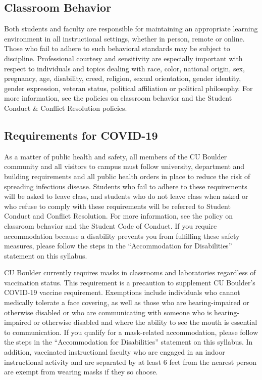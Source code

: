 \documentclass[9pt]{article}
\begin{document}
{\small

    \subsection*{Classroom Behavior}
Both students and faculty are responsible for maintaining an appropriate learning environment in all instructional settings, whether in person, remote or online. Those who fail to adhere to such behavioral standards may be subject to discipline. Professional courtesy and sensitivity are especially important with respect to individuals and topics dealing with race, color, national origin, sex, pregnancy, age, disability, creed, religion, sexual orientation, gender identity, gender expression, veteran status, political affiliation or political philosophy.  For more information, see the policies on classroom behavior and the Student Conduct \& Conflict Resolution policies.

\subsection*{Requirements for COVID-19}
As a matter of public health and safety, all members of the CU Boulder community and all visitors to campus must follow university, department and building requirements and all public health orders in place to reduce the risk of spreading infectious disease. Students who fail to adhere to these requirements will be asked to leave class, and students who do not leave class when asked or who refuse to comply with these requirements will be referred to Student Conduct and Conflict Resolution. For more information, see the policy on classroom behavior and the Student Code of Conduct. If you require accommodation because a disability prevents you from fulfilling these safety measures, please follow the steps in the “Accommodation for Disabilities” statement on this syllabus.

CU Boulder currently requires masks in classrooms and laboratories regardless of vaccination status. This requirement is a precaution to supplement CU Boulder’s COVID-19 vaccine requirement. Exemptions include individuals who cannot medically tolerate a face covering, as well as those who are hearing-impaired or otherwise disabled or who are communicating with someone who is hearing-impaired or otherwise disabled and where the ability to see the mouth is essential to communication. If you qualify for a mask-related accommodation, please follow the steps in the “Accommodation for Disabilities” statement on this syllabus. In addition, vaccinated instructional faculty who are engaged in an indoor instructional activity and are separated by at least 6 feet from the nearest person are exempt from wearing masks if they so choose.

}
\end{document}
